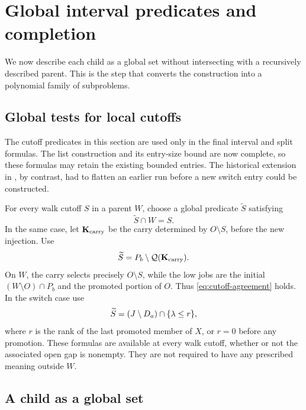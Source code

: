 \section{Global interval predicates and completion}\label{sec:descriptions}

We now describe each child as a global set without intersecting
with a recursively described parent. This is the step that converts
the construction into a polynomial family of subproblems.

\subsection{Global tests for local cutoffs}

The cutoff predicates in this section are used only in the final
interval and split formulas. The list construction and its entry-size
bound are now complete, so these formulas may retain the existing
bounded entries. The historical extension in ,
by contrast, had to flatten an earlier run before a new switch
entry could be constructed.

For every walk cutoff \(S\) in a parent \(W\), choose a global
predicate \(\widetilde S\) satisfying
\begin{equation}
 \widetilde S\cap W=S.
 \label{eq:cutoff-agreement}
\end{equation}
In the same case, let \(\mathbf K_{\mathrm{carry}}\) be the carry determined
by \(O\setminus S\), before the new injection. Use
\begin{equation}
 \widetilde S=P_b\setminus\mathcal Q(\mathbf K_{\mathrm{carry}}).
 \label{eq:direct-same-cutoff}
\end{equation}
On \(W\), the carry selects precisely \(O\setminus S\), while
the low jobs are the initial \((W\setminus O)\cap P_b\) and the
promoted portion of \(O\). Thus \eqref{eq:cutoff-agreement} holds.
In the switch case use
\begin{equation}
 \widetilde S=(J\setminus D_a)\cap\{\lambda\le r\},
 \label{eq:direct-switch-cutoff}
\end{equation}
where \(r\) is the rank of the last promoted member of \(X\),
or \(r=0\) before any promotion.
These formulas are available at every walk cutoff, whether or not
the associated open gap is nonempty.
They are not required to have any prescribed meaning outside \(W\).

\subsection{A child as a global set}

